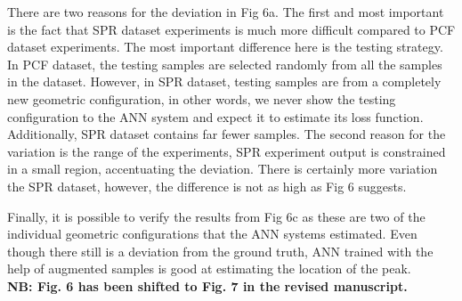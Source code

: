 \documentclass{article}
\begin{document}
	There are two reasons for the deviation in Fig 6a. The first and most important is the fact that SPR dataset experiments is much more difficult compared to PCF dataset experiments. The most important difference here is the testing strategy. In PCF dataset, the testing samples are selected randomly from all the samples in the dataset. However, in SPR dataset, testing samples are from a completely new geometric configuration, in other words, we never show the testing configuration to the ANN system and expect it to estimate its loss function. Additionally, SPR dataset contains far fewer samples. The second reason for the variation is the range of the experiments, SPR experiment output is constrained in a small region, accentuating the deviation. There is certainly more variation the SPR dataset, however, the difference is not as high as Fig 6 suggests.
	
	Finally, it is possible to verify the results from Fig 6c as these are two of the individual geometric configurations that the ANN systems estimated. Even though there still is a deviation from the ground truth, ANN trained with the help of augmented samples is good at estimating the location of the peak. \\
	
	\textbf{NB: Fig. 6 has been shifted to Fig. 7 in the revised manuscript.}
\end{document}
